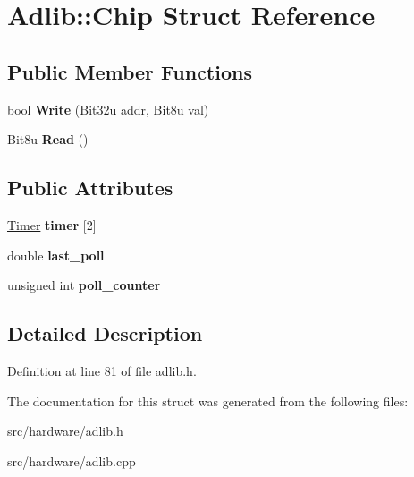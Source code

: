 \hypertarget{structAdlib_1_1Chip}{\section{Adlib\-:\-:Chip Struct Reference}
\label{structAdlib_1_1Chip}
}
\subsection*{Public Member Functions}
\begin{DoxyCompactItemize}
\item 
\hypertarget{structAdlib_1_1Chip_ad28b029cb4ec56ff900b160c00accad0}{bool {\bfseries Write} (Bit32u addr, Bit8u val)}\label{structAdlib_1_1Chip_ad28b029cb4ec56ff900b160c00accad0}

\item 
\hypertarget{structAdlib_1_1Chip_a472381a44ada102a7df220a9d16d002f}{Bit8u {\bfseries Read} ()}\label{structAdlib_1_1Chip_a472381a44ada102a7df220a9d16d002f}

\end{DoxyCompactItemize}
\subsection*{Public Attributes}
\begin{DoxyCompactItemize}
\item 
\hypertarget{structAdlib_1_1Chip_a98d53752542a19e358f02a3da4cf473e}{\hyperlink{structAdlib_1_1Timer}{Timer} {\bfseries timer} \mbox{[}2\mbox{]}}\label{structAdlib_1_1Chip_a98d53752542a19e358f02a3da4cf473e}

\item 
\hypertarget{structAdlib_1_1Chip_ac92c16633c6051b3b9721944a809925c}{double {\bfseries last\-\_\-poll}}\label{structAdlib_1_1Chip_ac92c16633c6051b3b9721944a809925c}

\item 
\hypertarget{structAdlib_1_1Chip_a0f964ac7fe648a9302e5c0ba219fb7da}{unsigned int {\bfseries poll\-\_\-counter}}\label{structAdlib_1_1Chip_a0f964ac7fe648a9302e5c0ba219fb7da}

\end{DoxyCompactItemize}


\subsection{Detailed Description}


Definition at line 81 of file adlib.\-h.



The documentation for this struct was generated from the following files\-:\begin{DoxyCompactItemize}
\item 
src/hardware/adlib.\-h\item 
src/hardware/adlib.\-cpp\end{DoxyCompactItemize}
